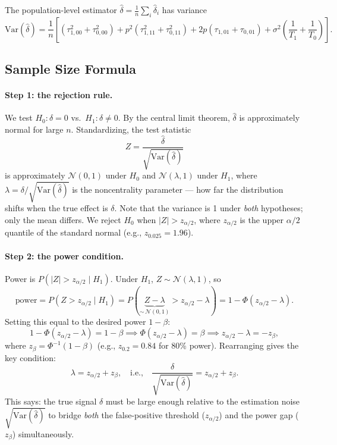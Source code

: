 \documentclass{article}
\begin{document}
The population-level estimator $\hat{\delta} = \frac{1}{n}\sum_i \hat{\delta}_i$ has variance
\[
    \mathrm{Var}(\hat{\delta})
    = \frac{1}{n}\left[
        (\tau^2_{1,00} + \tau^2_{0,00})
        + p^2(\tau^2_{1,11} + \tau^2_{0,11})
        + 2p(\tau_{1,01} + \tau_{0,01})
        + \sigma^2\!\left(\frac{1}{T_1} + \frac{1}{T_0}\right)
    \right].
\]

\subsection{Sample Size Formula}

\paragraph{Step 1: the rejection rule.}
We test $H_0: \delta = 0$ vs.\ $H_1: \delta \neq 0$.
By the central limit theorem, $\hat{\delta}$ is approximately normal for large $n$.
Standardizing, the test statistic
\[
    Z = \frac{\hat{\delta}}{\sqrt{\mathrm{Var}(\hat{\delta})}}
\]
is approximately $\mathcal{N}(0, 1)$ under $H_0$ and $\mathcal{N}(\lambda, 1)$ under $H_1$,
where $\lambda = \delta / \sqrt{\mathrm{Var}(\hat{\delta})}$ is the noncentrality parameter —
how far the distribution shifts when the true effect is $\delta$.
Note that the variance is 1 under \emph{both} hypotheses; only the mean differs.
We reject $H_0$ when $|Z| > z_{\alpha/2}$, where $z_{\alpha/2}$ is the upper $\alpha/2$ quantile
of the standard normal (e.g., $z_{0.025} = 1.96$).

\paragraph{Step 2: the power condition.}
Power is $P(|Z| > z_{\alpha/2} \mid H_1)$.
Under $H_1$, $Z \sim \mathcal{N}(\lambda, 1)$, so
\[
    \text{power}
    = P(Z > z_{\alpha/2} \mid H_1)
    = P\!\left(\underbrace{Z - \lambda}_{\sim\,\mathcal{N}(0,1)} > z_{\alpha/2} - \lambda\right)
    = 1 - \Phi(z_{\alpha/2} - \lambda).
\]
Setting this equal to the desired power $1 - \beta$:
\[
    1 - \Phi(z_{\alpha/2} - \lambda) = 1 - \beta
    \implies
    \Phi(z_{\alpha/2} - \lambda) = \beta
    \implies
    z_{\alpha/2} - \lambda = -z_\beta,
\]
where $z_\beta = \Phi^{-1}(1-\beta)$ (e.g., $z_{0.2} = 0.84$ for 80\% power).
Rearranging gives the key condition:
\[
    \lambda = z_{\alpha/2} + z_\beta,
    \quad\text{i.e.,}\quad
    \frac{\delta}{\sqrt{\mathrm{Var}(\hat{\delta})}} = z_{\alpha/2} + z_\beta.
\]
This says: the true signal $\delta$ must be large enough relative to the estimation noise
$\sqrt{\mathrm{Var}(\hat{\delta})}$ to bridge \emph{both} the false-positive threshold
($z_{\alpha/2}$) and the power gap ($z_\beta$) simultaneously.
\end{document}
